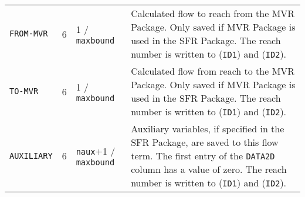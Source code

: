 \begin{longtable}{p{3.5cm} p{2cm} p{3.5cm} p{6.5cm}}
\texttt{FROM-MVR} & 6 & 1 / \texttt{maxbound} & Calculated flow to reach from the MVR Package. Only saved if MVR Package is used in the SFR Package. The reach number is written to (\texttt{ID1}) and (\texttt{ID2}). \\
\texttt{TO-MVR} & 6 & 1 / \texttt{maxbound} & Calculated flow from reach to the MVR Package. Only saved if MVR Package is used in the SFR Package. The reach number is written to (\texttt{ID1}) and (\texttt{ID2}). \\
\texttt{AUXILIARY} & 6 & \texttt{naux}+1 / \texttt{maxbound} & Auxiliary variables, if specified in the SFR Package, are saved to this flow term. The first entry of the \texttt{DATA2D} column has a value of zero.  The reach number is written to (\texttt{ID1}) and (\texttt{ID2}). 
\label{table:binarysfr}
\end{longtable}


